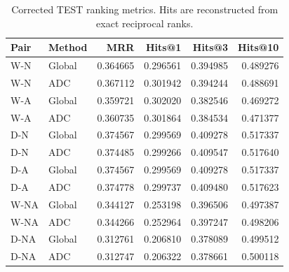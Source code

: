 \begin{table}[htbp]
\centering\small
\caption{Corrected TEST ranking metrics. Hits are reconstructed from exact reciprocal ranks.}
\label{tab:rerun-hits}
\begin{tabular}{llrrrr}
\toprule
Pair & Method & MRR & Hits@1 & Hits@3 & Hits@10\\
\midrule
W-N & Global & 0.364665 & 0.296561 & 0.394985 & 0.489276\\
W-N & ADC & 0.367112 & 0.301942 & 0.394244 & 0.488691\\
W-A & Global & 0.359721 & 0.302020 & 0.382546 & 0.469272\\
W-A & ADC & 0.360735 & 0.301864 & 0.384534 & 0.471377\\
D-N & Global & 0.374567 & 0.299569 & 0.409278 & 0.517337\\
D-N & ADC & 0.374485 & 0.299266 & 0.409547 & 0.517640\\
D-A & Global & 0.374567 & 0.299569 & 0.409278 & 0.517337\\
D-A & ADC & 0.374778 & 0.299737 & 0.409480 & 0.517623\\
W-NA & Global & 0.344127 & 0.253198 & 0.396506 & 0.497387\\
W-NA & ADC & 0.344266 & 0.252964 & 0.397247 & 0.498206\\
D-NA & Global & 0.312761 & 0.206810 & 0.378089 & 0.499512\\
D-NA & ADC & 0.312747 & 0.206322 & 0.378661 & 0.500118\\
\bottomrule
\end{tabular}
\end{table}
